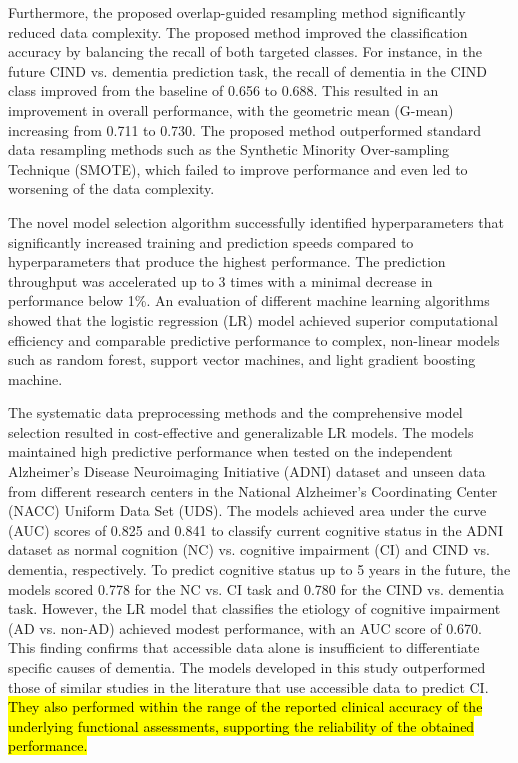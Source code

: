 Furthermore, the proposed overlap-guided resampling method significantly reduced data complexity. The proposed method improved the classification accuracy by balancing the recall of both targeted classes. For instance, in the future CIND vs. dementia prediction task, the recall of dementia in the CIND class improved from the baseline of 0.656 to 0.688. This resulted in an improvement in overall performance, with the geometric mean (\acrshort{G-mean}) increasing from 0.711 to 0.730. The proposed method outperformed standard data resampling methods such as the Synthetic Minority Over-sampling Technique (\acrshort{SMOTE}), which failed to improve performance and even led to worsening of the data complexity.

The novel model selection algorithm successfully identified hyperparameters that significantly increased training and prediction speeds compared to hyperparameters that produce the highest performance. The prediction throughput was accelerated up to 3 times with a minimal decrease in performance below 1\%. An evaluation of different machine learning algorithms showed that the logistic regression (\acrshort{LR}) model achieved superior computational efficiency and comparable predictive performance to complex, non-linear models such as random forest, support vector machines, and light gradient boosting machine.

The systematic data preprocessing methods and the comprehensive model selection resulted in cost-effective and generalizable LR models. The models maintained high predictive performance when tested on the independent Alzheimer's Disease Neuroimaging Initiative (\acrshort{ADNI}) dataset and unseen data from different research centers in the National Alzheimer's Coordinating Center (\acrshort{NACC}) Uniform Data Set (\acrshort{UDS}). The models achieved area under the curve (\acrshort{AUC}) scores of 0.825 and 0.841 to classify current cognitive status in the ADNI dataset as normal cognition (\acrshort{NC}) vs. cognitive impairment (CI) and CIND vs. dementia, respectively. To predict cognitive status up to 5 years in the future, the models scored 0.778 for the NC vs. CI task and 0.780 for the CIND vs. dementia task. However, the LR model that classifies the etiology of cognitive impairment (AD vs. non-AD) achieved modest performance, with an AUC score of 0.670. This finding confirms that accessible data alone is insufficient to differentiate specific causes of dementia. The models developed in this study outperformed those of similar studies in the literature that use accessible data to predict CI. \hl{They also performed within the range of the reported clinical accuracy of the underlying functional assessments, supporting the reliability of the obtained performance.}

